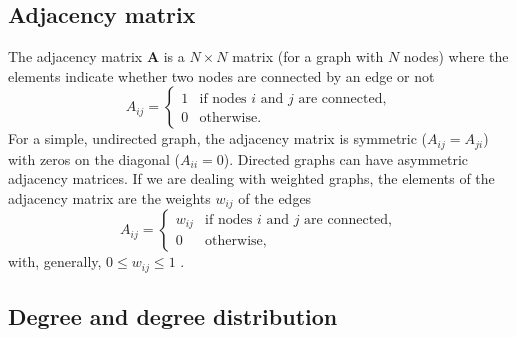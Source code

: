 \documentclass[11 pt , letterpaper , twoside , openright]{book}
\begin{document}
\subsection{Adjacency matrix}

The adjacency matrix \textbf{A} is a $N \times N$ matrix (for a graph with $N$ nodes) where the elements indicate whether two nodes are connected by an edge or not \cite{Mata2020}
\begin{equation}
	A_{ij} = 
	\begin{cases}
		1 & \text{if nodes $i$ and $j$ are connected},\\
		0 & \text{otherwise}.
	\end{cases}
\end{equation}
For a simple, undirected graph, the adjacency matrix is symmetric ($A_{ij} = A_{ji}$) with zeros on the diagonal ($A_{ii} = 0$). Directed graphs can have asymmetric adjacency matrices. If we are dealing with weighted graphs, the elements of the adjacency matrix are the weights $w_{ij}$ of the edges
\begin{equation}
	A_{ij} = 
	\begin{cases}
		w_{ij} & \text{if nodes $i$ and $j$ are connected},\\
		0 & \text{otherwise},
	\end{cases}
\end{equation}
with, generally, $0 \leqslant w_{ij} \leqslant 1$ \cite{Mata2020}. 

\subsection{Degree and degree distribution}
\end{document}
